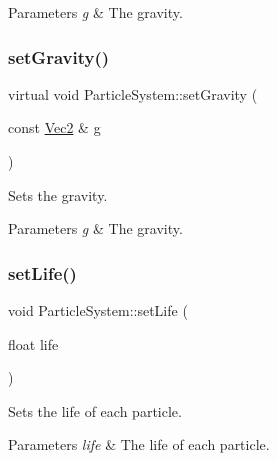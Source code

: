 \begin{DoxyParams}{Parameters}
{\em g} & The gravity. \\
\hline
\end{DoxyParams}
\mbox{\label{classParticleSystem_a0696a1081d5f9f8879ace4e81f447015}} 
\subsubsection{\texorpdfstring{set\+Gravity()}{setGravity()}\hspace{0.1cm}{\footnotesize\ttfamily [2/2]}}
{\footnotesize\ttfamily virtual void Particle\+System\+::set\+Gravity (\begin{DoxyParamCaption}\item[{const \hyperlink{classVec2}{Vec2} \&}]{g }\end{DoxyParamCaption})\hspace{0.3cm}{\ttfamily [virtual]}}

Sets the gravity.


\begin{DoxyParams}{Parameters}
{\em g} & The gravity. \\
\hline
\end{DoxyParams}
\mbox{\label{classParticleSystem_ac5569a6291b2920b54b64340c14c5db9}} 
\subsubsection{\texorpdfstring{set\+Life()}{setLife()}\hspace{0.1cm}{\footnotesize\ttfamily [1/2]}}
{\footnotesize\ttfamily void Particle\+System\+::set\+Life (\begin{DoxyParamCaption}\item[{float}]{life }\end{DoxyParamCaption})\hspace{0.3cm}{\ttfamily [inline]}}

Sets the life of each particle.


\begin{DoxyParams}{Parameters}
{\em life} & The life of each particle. \\
\hline
\end{DoxyParams}
\mbox{\label{classParticleSystem_ac5569a6291b2920b54b64340c14c5db9}} 
